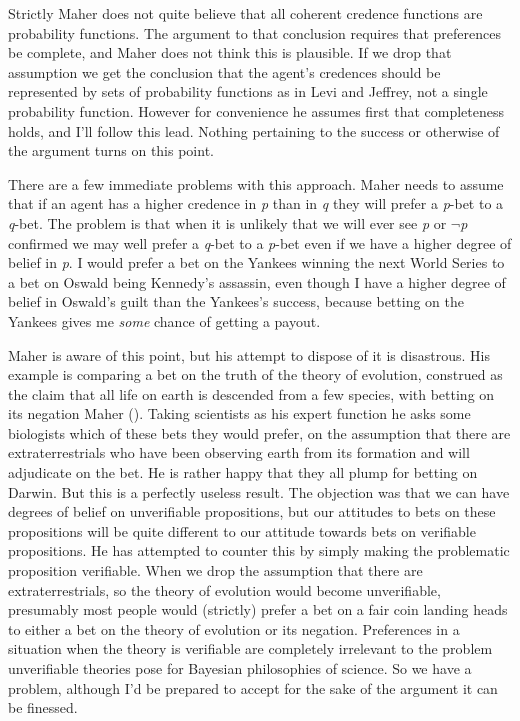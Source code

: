 \documentclass[
  10pt,
  letterpaper,
  DIV=11,
  numbers=noendperiod,
  twoside]{scrartcl}
\begin{document}
Strictly Maher does not quite believe that all coherent credence
functions are probability functions. The argument to that conclusion
requires that preferences be complete, and Maher does not think this is
plausible. If we drop that assumption we get the conclusion that the
agent's credences should be represented by sets of probability functions
as in Levi and Jeffrey, not a single probability function. However for
convenience he assumes first that completeness holds, and I'll follow
this lead. Nothing pertaining to the success or otherwise of the
argument turns on this point.

There are a few immediate problems with this approach. Maher needs to
assume that if an agent has a higher credence in \emph{p} than in
\emph{q} they will prefer a \emph{p}-bet to a \emph{q}-bet. The problem
is that when it is unlikely that we will ever see \emph{p} or
\({\lnot}\)\emph{p} confirmed we may well prefer a \emph{q}-bet to a
\emph{p}-bet even if we have a higher degree of belief in \emph{p}. I
would prefer a bet on the Yankees winning the next World Series to a bet
on Oswald being Kennedy's assassin, even though I have a higher degree
of belief in Oswald's guilt than the Yankees's success, because betting
on the Yankees gives me \emph{some} chance of getting a payout.

Maher is aware of this point, but his attempt to dispose of it is
disastrous. His example is comparing a bet on the truth of the theory of
evolution, construed as the claim that all life on earth is descended
from a few species, with betting on its negation Maher
(). Taking scientists as his expert
function he asks some biologists which of these bets they would prefer,
on the assumption that there are extraterrestrials who have been
observing earth from its formation and will adjudicate on the bet. He is
rather happy that they all plump for betting on Darwin. But this is a
perfectly useless result. The objection was that we can have degrees of
belief on unverifiable propositions, but our attitudes to bets on these
propositions will be quite different to our attitude towards bets on
verifiable propositions. He has attempted to counter this by simply
making the problematic proposition verifiable. When we drop the
assumption that there are extraterrestrials, so the theory of evolution
would become unverifiable, presumably most people would (strictly)
prefer a bet on a fair coin landing heads to either a bet on the theory
of evolution or its negation. Preferences in a situation when the theory
is verifiable are completely irrelevant to the problem unverifiable
theories pose for Bayesian philosophies of science. So we have a
problem, although I'd be prepared to accept for the sake of the argument
it can be finessed.
\end{document}
